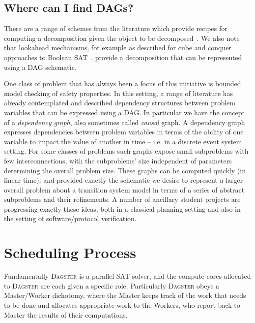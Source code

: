\documentclass[
10pt, %
a4paper, %
oneside, %
headinclude,footinclude, %
BCOR5mm, %
]{scrartcl}
\begin{document}
\subsection{Where can I find DAGs?}


There are a range of schemes from the literature which provide recipes for computing a decomposition given the object to be decomposed~\cite{conf/ictai/HabetPT09,NEURIPS2019_6e62a992}.
We also note that lookahead mechanisms, for example as described for cube and conquer approaches to Boolean SAT~\cite{cube_and_conquer1}, provide a decomposition that can be represented using a DAG schematic. 

One class of problem that has always been a focus of this initiative is bounded model checking of safety properties. 
In this setting, a range of literature has already contemplated and described dependency structures between problem variables that can be expressed using a DAG.
In particular we have the concept of a {\em dependency graph}, also sometimes called {\em causal} graph\cite{Knoblock94,WilliamsN97}.
A dependency graph expresses dependencies between problem variables in terms of the ability of one variable to impact the value of another in time -- i.e. in a discrete event system setting.
For some classes of problems such graphs expose small subproblems with few interconnections, with the subproblems’ size independent of parameters determining the overall problem size.
These graphs can be computed quickly (in linear time), and provided exactly the schematic we desire to represent a larger overall problem about a transition system model in terms of a series of abstract subproblems and their refinements.  
A number of ancillary student projects are progressing exactly these ideas, both in a classical planning setting and also in the setting of software/protocol verification. 


\section{Scheduling Process}\label{sec:configuration}

Fundamentally \textsc{Dagster} is a parallel SAT solver, and the compute cores allocated to \textsc{Dagster} are each given a specific role.
Particularly \textsc{Dagster} obeys a Master/Worker dichotomy, where the Master keeps track of the work that needs to be done and allocates appropriate work to the Workers, who
report back to Master the results of their computations.
\end{document}
